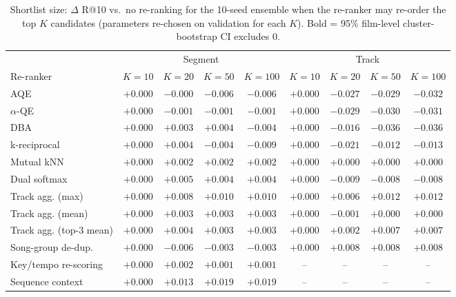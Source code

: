 \begin{table}[t]
\centering
\small
\caption{Shortlist size: $\Delta$ R@10 vs.\ no re-ranking for the 10-seed ensemble when the re-ranker may re-order the
top $K$ candidates (parameters re-chosen on validation for each $K$). Bold = 95\% film-level cluster-bootstrap CI excludes 0.}
\label{tab:supp_rerank_k}
\begin{tabular}{@{}lcccccccc@{}}
\toprule
 & \multicolumn{4}{c}{Segment} & \multicolumn{4}{c}{Track} \\
\cmidrule(lr){2-5}\cmidrule(lr){6-9}
Re-ranker & $K{=}10$ & $K{=}20$ & $K{=}50$ & $K{=}100$ & $K{=}10$ & $K{=}20$ & $K{=}50$ & $K{=}100$ \\
\midrule
AQE & $+0.000$ & $-0.000$ & $-0.006$ & $-0.006$ & $+0.000$ & $\mathbf{-0.027}$ & $\mathbf{-0.029}$ & $\mathbf{-0.032}$ \\
$\alpha$-QE & $+0.000$ & $-0.001$ & $-0.001$ & $-0.001$ & $+0.000$ & $\mathbf{-0.029}$ & $\mathbf{-0.030}$ & $\mathbf{-0.031}$ \\
DBA & $+0.000$ & $+0.003$ & $+0.004$ & $-0.004$ & $+0.000$ & $-0.016$ & $\mathbf{-0.036}$ & $\mathbf{-0.036}$ \\
k-reciprocal & $+0.000$ & $+0.004$ & $-0.004$ & $\mathbf{-0.009}$ & $+0.000$ & $-0.021$ & $-0.012$ & $-0.013$ \\
Mutual kNN & $+0.000$ & $+0.002$ & $+0.002$ & $+0.002$ & $+0.000$ & $+0.000$ & $+0.000$ & $+0.000$ \\
Dual softmax & $+0.000$ & $+0.005$ & $+0.004$ & $+0.004$ & $+0.000$ & $-0.009$ & $-0.008$ & $-0.008$ \\
Track agg. (max) & $+0.000$ & $\mathbf{+0.008}$ & $\mathbf{+0.010}$ & $\mathbf{+0.010}$ & $+0.000$ & $+0.006$ & $+0.012$ & $+0.012$ \\
Track agg. (mean) & $+0.000$ & $+0.003$ & $+0.003$ & $+0.003$ & $+0.000$ & $-0.001$ & $+0.000$ & $+0.000$ \\
Track agg. (top-3 mean) & $+0.000$ & $+0.004$ & $+0.003$ & $+0.003$ & $+0.000$ & $+0.002$ & $+0.007$ & $+0.007$ \\
Song-group de-dup. & $+0.000$ & $-0.006$ & $-0.003$ & $-0.003$ & $+0.000$ & $\mathbf{+0.008}$ & $\mathbf{+0.008}$ & $\mathbf{+0.008}$ \\
Key/tempo re-scoring & $+0.000$ & $+0.002$ & $+0.001$ & $+0.001$ & -- & -- & -- & -- \\
Sequence context & $+0.000$ & $\mathbf{+0.013}$ & $\mathbf{+0.019}$ & $\mathbf{+0.019}$ & -- & -- & -- & -- \\
\bottomrule
\end{tabular}
\end{table}
